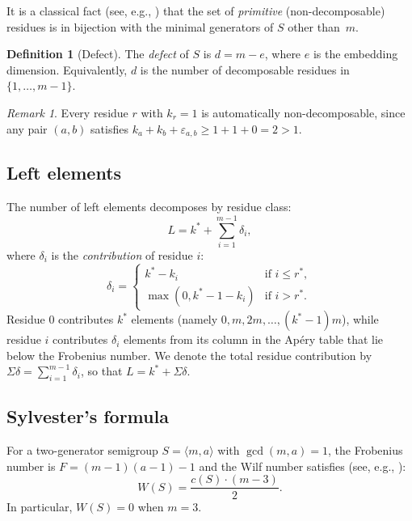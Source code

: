 \documentclass[11pt]{amsart}
\theoremstyle{definition}
\newtheorem{definition}[theorem]{Definition}
\theoremstyle{remark}
\newtheorem{remark}[theorem]{Remark}
\begin{document}
It is a classical fact (see, e.g., \cite{Eliahou2020}) that the set of
\emph{primitive} (non-decomposable) residues is in bijection with the minimal
generators of $S$ other than~$m$.

\begin{definition}[Defect]\label{def:defect}
The \emph{defect} of $S$ is $d = m - e$, where $e$ is the embedding dimension.
Equivalently, $d$ is the number of decomposable residues in
$\{1, \ldots, m-1\}$.
\end{definition}

\begin{remark}\label{rem:level1}
Every residue $r$ with $k_r = 1$ is automatically non-decomposable, since
any pair $(a, b)$ satisfies $k_a + k_b + \varepsilon_{a,b} \ge 1 + 1 + 0 = 2 > 1$.
\end{remark}

\subsection{Left elements}

The number of left elements decomposes by residue class:
\begin{equation}\label{eq:L-decomp}
  L = k^* + \sum_{i=1}^{m-1} \delta_i,
\end{equation}
where $\delta_i$ is the \emph{contribution} of residue $i$:
\begin{equation}\label{eq:delta}
  \delta_i =
  \begin{cases}
    k^* - k_i & \text{if } i \le r^*, \\
    \max(0, k^* - 1 - k_i) & \text{if } i > r^*.
  \end{cases}
\end{equation}
Residue $0$ contributes $k^*$ elements (namely $0, m, 2m, \ldots, (k^*-1)m$),
while residue $i$ contributes $\delta_i$ elements from its column in the
Ap\'ery table that lie below the Frobenius number.
We denote the total residue contribution by $\Sigma\delta = \sum_{i=1}^{m-1} \delta_i$,
so that $L = k^* + \Sigma\delta$.

\subsection{Sylvester's formula}

For a two-generator semigroup $S = \langle m, a \rangle$ with $\gcd(m, a) = 1$,
the Frobenius number is $F = (m-1)(a-1) - 1$ and the Wilf number satisfies
(see, e.g., \cite{Sylvester1884}):
\begin{equation}\label{eq:sylvester}
  W(S) = \frac{c(S) \cdot (m - 3)}{2}.
\end{equation}
In particular, $W(S) = 0$ when $m = 3$.
\end{document}

